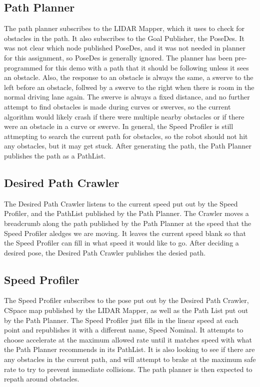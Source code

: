 \documentclass{article}
\begin{document}
\subsection{Path Planner}

The path planner subscribes to the LIDAR Mapper, which it uses to check for obstacles in the path.
It also subscribes to the Goal Publisher, the PoseDes.  It was not clear which node published PoseDes, and it was not needed in planner for this assignment, so PoseDes is generally ignored.
The planner has been pre-programmed for this demo with a path that it should be following unless it sees an obstacle.
Also, the response to an obstacle is always the same, a swerve to the left before an obstacle, follwed by a swerve to the right when there is room in the normal driving lane again.
The swerve is always a fixed distance, and no further attempt to find obstacles is made during curves or swerves, so the current algorithm would likely crash if there were multiple nearby obstacles or if there were an obstacle in a curve or swerve.
In general, the Speed Profiler is still attmepting to search the current path for obstacles, so the robot should not hit any obstacles, but it may get stuck.
After generating the path, the Path Planner publishes the path as a PathList.

\subsection{Desired Path Crawler}

The Desired Path Crawler listens to the current speed put out by the Speed Profiler, and the PathList published by the Path Planner.
The Crawler moves a breadcrumb along the path published by the Path Planner at the speed that the Speed Profiler aledges we are moving.
It leaves the current speed blank so that the Speed Profiler can fill in what speed it would like to go.
After deciding a desired pose, the Desired Path Crawler publishes the desied path.

\subsection{Speed Profiler}

The Speed Profiler subscribes to the pose put out by the Desired Path Crawler, CSpace map published by the LIDAR Mapper, as well as the Path List put out by the Path Planner.
The Speed Profiler just fills in the linear speed at each point and republishes it with a different name, Speed Nominal.
It attempts to choose accelerate at the maximum allowed rate until it matches speed with what the Path Planner recommends in its PathList.
It is also looking to see if there are any obstacles in the current path, and will attempt to brake at the maximum safe rate to try to prevent immediate collisions.
The path planner is then expected to repath around obstacles.
\end{document}
